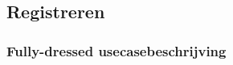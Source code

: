 
\clearpage\label{sec:usecaseregistreren}\subsection{Registreren}

\subsubsection{Fully-dressed usecasebeschrijving}
